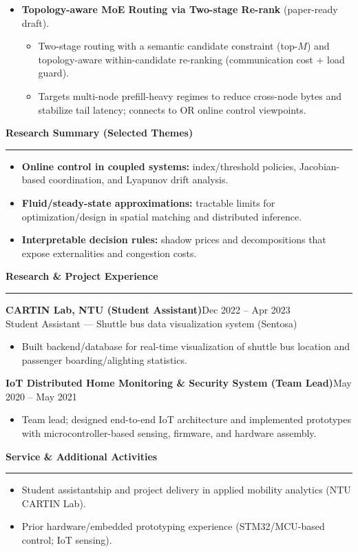 \documentclass[11pt,a4paper]{article}
\newcommand{\cvsection}[1]{\vspace{2pt}\noindent\textbf{\large #1}\\[-2pt]\textcolor{cvgray}{\rule{\linewidth}{0.4pt}}\vspace{2pt}}
\newcommand{\cvitem}[2]{\textbf{#1}\hfill \textcolor{cvgray}{#2}\\}
\begin{document}
\begin{itemize}
  \item \textbf{Topology-aware MoE Routing via Two-stage Re-rank} (paper-ready draft).
  \begin{itemize}
    \item Two-stage routing with a semantic candidate constraint (top-$M$) and topology-aware within-candidate re-ranking (communication cost + load guard).
    \item Targets multi-node prefill-heavy regimes to reduce cross-node bytes and stabilize tail latency; connects to OR online control viewpoints.
  \end{itemize}
\end{itemize}

\cvsection{Research Summary (Selected Themes)}
\begin{itemize}
  \item \textbf{Online control in coupled systems:} index/threshold policies, Jacobian-based coordination, and Lyapunov drift analysis.
  \item \textbf{Fluid/steady-state approximations:} tractable limits for optimization/design in spatial matching and distributed inference.
  \item \textbf{Interpretable decision rules:} shadow prices and decompositions that expose externalities and congestion costs.
\end{itemize}

\cvsection{Research \& Project Experience}
\cvitem{CARTIN Lab, NTU (Student Assistant)}{Dec 2022 -- Apr 2023}
Student Assistant --- Shuttle bus data visualization system (Sentosa)\\[-2pt]
\begin{itemize}
  \item Built backend/database for real-time visualization of shuttle bus location and passenger boarding/alighting statistics.
\end{itemize}

\cvitem{IoT Distributed Home Monitoring \& Security System (Team Lead)}{May 2020 -- May 2021}
\begin{itemize}
  \item Team lead; designed end-to-end IoT architecture and implemented prototypes with microcontroller-based sensing, firmware, and hardware assembly.
\end{itemize}

\cvsection{Service \& Additional Activities}
\begin{itemize}
  \item Student assistantship and project delivery in applied mobility analytics (NTU CARTIN Lab).
  \item Prior hardware/embedded prototyping experience (STM32/MCU-based control; IoT sensing).
\end{itemize}
\end{document}
